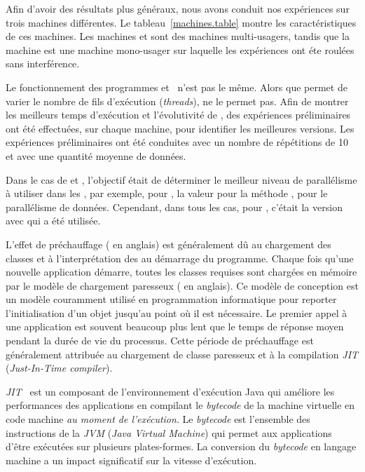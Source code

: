 Afin d'avoir des r\'esultats plus g\'en\'eraux, nous avons conduit nos exp\'eriences sur trois machines diff\'erentes. Le tableau~\ref{machines.table} montre les caract\'eristiques de ces machines. Les machines  et  sont des machines multi-usagers, tandis que la machine  est une machine mono-usager sur laquelle les exp\'eriences ont \'et\/e roul\'ees sans interf\'erence.

Le fonctionnement des programmes  et~ n'est pas le m\^eme. Alors que  permet de varier le nombre de fils d'ex\'ecution (\emph{threads}),  ne le permet pas. Afin de montrer les meilleurs temps d'ex\'ecution et l'\'evolutivit\'e de , des exp\'eriences pr\'eliminaires ont \'et\'e effectu\'ees, sur chaque machine, pour identifier les meilleures versions. Les exp\'eriences pr\'eliminaires ont \'et\'e conduites avec un nombre de r\'ep\'etitions de 10 et avec une quantit\'e moyenne de donn\'ees. 

Dans le cas de  et , l'objectif \'etait de d\'eterminer le meilleur niveau de parall\'elisme \`a utiliser dans les , par exemple, pour , la valeur pour la m\'ethode , pour le parall\'elisme de donn\'ees. Cependant, dans tous les cas, pour , c'\'etait la version avec  qui a \'et\'e utilis\'ee.

L'effet de pr\'echauffage ( en anglais) est g\'en\'eralement d\^u au chargement des classes et \`a l'interpr\'etation des  au d\'emarrage du programme. Chaque fois qu'une nouvelle application d\'emarre, toutes les classes requises sont charg\'ees en m\'emoire par le mod\`ele de chargement paresseux ( en anglais). Ce mod\`ele de conception est un mod\`ele couramment utilis\'e en programmation informatique pour reporter l'initialisation d'un objet jusqu'au point o\`u il est n\'ecessaire. Le premier appel \`a une application  est souvent beaucoup plus lent que le temps de r\'eponse moyen pendant la dur\'ee de vie du processus. Cette p\'eriode de pr\'echauffage est g\'en\'eralement attribu\'ee au chargement de classe paresseux et à la compilation \emph{JIT} (\emph{Just-In-Time compiler}).    

\label{jitDescription.sect}
\emph{JIT}~\citep{cramer1997compiling} est un composant de l'environnement d'ex\'ecution Java qui am\'eliore les performances des applications en compilant le \emph{bytecode} de la machine virtuelle en code machine \emph{au moment de l'ex\'ecution}. Le \emph{bytecode} est l'ensemble des instructions de la \emph{JVM} (\emph{Java Virtual Machine}) qui permet aux applications d'\^etre ex\'ecut\'ees sur plusieurs plates-formes. La conversion du \emph{bytecode} en langage machine a un impact significatif sur la vitesse d'ex\'ecution.

